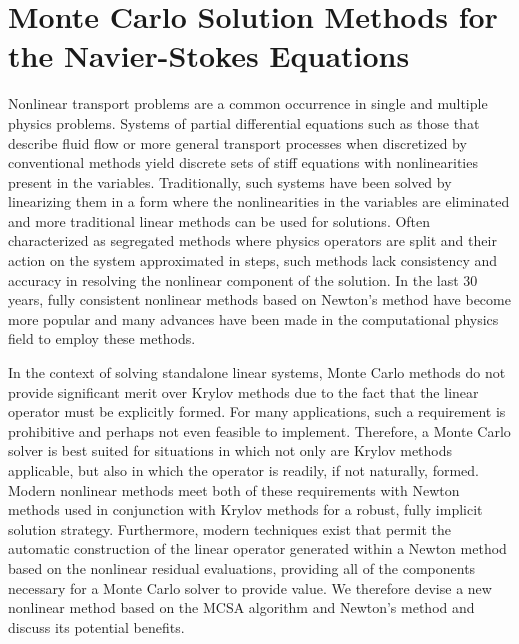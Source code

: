 \chapter{Monte Carlo Solution Methods for the Navier-Stokes Equations}
\label{ch:nonlinear_problem}
Nonlinear transport problems are a common occurrence in single and
multiple physics problems. Systems of partial differential equations
such as those that describe fluid flow or more general transport
processes when discretized by conventional methods yield discrete sets
of stiff equations with nonlinearities present in the
variables. Traditionally, such systems have been solved by linearizing
them in a form where the nonlinearities in the variables are
eliminated and more traditional linear methods can be used for
solutions. Often characterized as segregated methods where physics
operators are split and their action on the system approximated in
steps, such methods lack consistency and accuracy in resolving the
nonlinear component of the solution. In the last 30 years, fully
consistent nonlinear methods based on Newton's method have become more
popular and many advances have been made in the computational physics
field to employ these methods.

In the context of solving standalone linear systems, Monte Carlo
methods do not provide significant merit over Krylov methods due to
the fact that the linear operator must be explicitly formed. For many
applications, such a requirement is prohibitive and perhaps not even
feasible to implement. Therefore, a Monte Carlo solver is best suited
for situations in which not only are Krylov methods applicable, but
also in which the operator is readily, if not naturally,
formed. Modern nonlinear methods meet both of these requirements with
Newton methods used in conjunction with Krylov methods for a robust,
fully implicit solution strategy. Furthermore, modern techniques exist
that permit the automatic construction of the linear operator
generated within a Newton method based on the nonlinear residual
evaluations, providing all of the components necessary for a Monte
Carlo solver to provide value. We therefore devise a new nonlinear
method based on the MCSA algorithm and Newton's method and discuss its
potential benefits.

